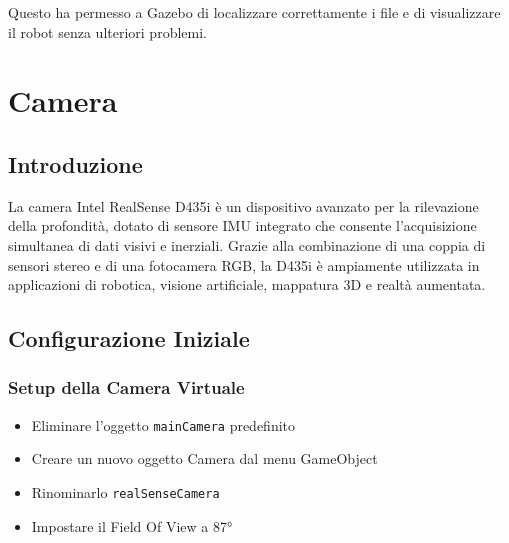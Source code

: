 \documentclass[11pt]{report}
\begin{document}
Questo ha permesso a Gazebo di localizzare correttamente i file e di visualizzare il robot senza ulteriori problemi.


\section{Camera}

\subsection{Introduzione}
La camera Intel RealSense D435i è un dispositivo avanzato per la rilevazione della profondità, dotato di sensore IMU integrato che consente l'acquisizione simultanea di dati visivi e inerziali. Grazie alla combinazione di una coppia di sensori stereo e di una fotocamera RGB, la D435i è ampiamente utilizzata in applicazioni di robotica, visione artificiale, mappatura 3D e realtà aumentata.

\subsection{Configurazione Iniziale}
\subsubsection{Setup della Camera Virtuale}
\begin{itemize}
\item Eliminare l'oggetto \texttt{mainCamera} predefinito
\item Creare un nuovo oggetto Camera dal menu GameObject
\item Rinominarlo \texttt{realSenseCamera}
\item Impostare il Field Of View a 87°
\end{itemize}
\end{document}
